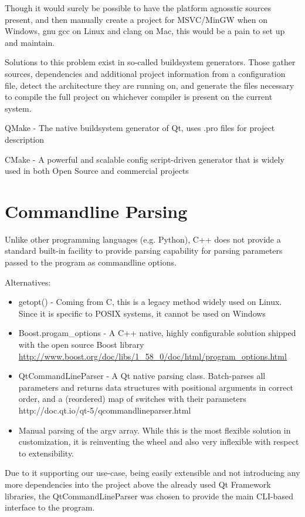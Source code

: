 Though it would surely be possible to have the platform agnosstic sources present, and then manually create a project for MSVC/MinGW when on Windows, gnu gcc on Linux and clang on Mac, this would be a pain to set up and maintain.

Solutions to this problem exist in so-called buildsystem generators. Those gather sources, dependencies and additional project information from a configuration file, detect the architecture they are running on, and generate the files necessary to compile the full project on whichever compiler is present on the current system.

QMake - The native buildsystem generator of Qt, uses .pro files for project description

CMake - A powerful and scalable config script-driven generator that is widely used in both Open Source and commercial projects 


\section{Commandline Parsing}
Unlike other programming languages (e.g. Python), C++ does not provide a standard built-in facility to provide parsing capability for parsing parameters passed to the program as commandline options.

Alternatives:

\begin{itemize}
\item getopt() - Coming from C, this is a legacy method widely used on Linux. Since it is specific to POSIX systems, it cannot be used on Windows 
\item Boost.progam\_options - A C++ native, highly configurable solution shipped with the open source Boost library
\url{http://www.boost.org/doc/libs/1\_58\_0/doc/html/program\_options.html}
\item QtCommandLineParser - A Qt native parsing class. Batch-parses all parameters and returns data structures with positional arguments in correct order, and a (reordered) map of switches with their parameters
http://doc.qt.io/qt-5/qcommandlineparser.html
\item Manual parsing of the argv array. While this is the most flexible solution in customization, it is reinventing the wheel and also very inflexible with respect to extensibility.
\end{itemize}

Due to it supporting our use-case, being easily extensible and not introducing any more dependencies into the project above the already used Qt Framework libraries, the QtCommandLineParser was chosen to provide the main CLI-based interface to the program.



